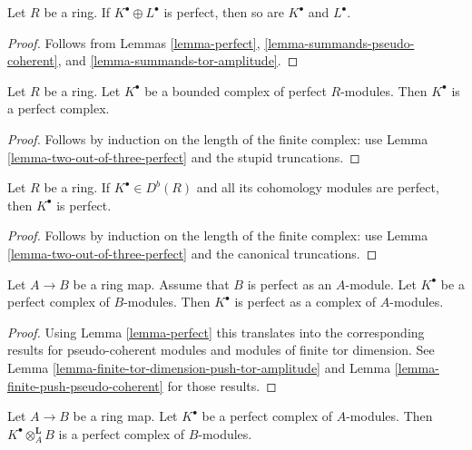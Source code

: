 \begin{lemma}
\label{lemma-summands-perfect}
Let $R$ be a ring. If $K^\bullet \oplus L^\bullet$ is perfect, then
so are $K^\bullet$ and $L^\bullet$.
\end{lemma}

\begin{proof}
Follows from
Lemmas \ref{lemma-perfect}, \ref{lemma-summands-pseudo-coherent}, and
\ref{lemma-summands-tor-amplitude}.
\end{proof}

\begin{lemma}
\label{lemma-complex-perfect-modules}
Let $R$ be a ring. Let $K^\bullet$ be a bounded complex of perfect
$R$-modules. Then $K^\bullet$ is a perfect complex.
\end{lemma}

\begin{proof}
Follows by induction on the length of the finite complex: use
Lemma \ref{lemma-two-out-of-three-perfect}
and the stupid truncations.
\end{proof}

\begin{lemma}
\label{lemma-cohomology-perfect}
Let $R$ be a ring. If $K^\bullet \in D^b(R)$ and all its cohomology
modules are perfect, then $K^\bullet$ is perfect.
\end{lemma}

\begin{proof}
Follows by induction on the length of the finite complex: use
Lemma \ref{lemma-two-out-of-three-perfect}
and the canonical truncations.
\end{proof}

\begin{lemma}
\label{lemma-perfect-push-perfect}
Let $A \to B$ be a ring map. Assume that $B$ is perfect as
an $A$-module. Let $K^\bullet$ be a perfect complex of $B$-modules.
Then $K^\bullet$ is perfect as a complex of $A$-modules.
\end{lemma}

\begin{proof}
Using
Lemma \ref{lemma-perfect}
this translates into the corresponding results for pseudo-coherent modules
and modules of finite tor dimension. See
Lemma \ref{lemma-finite-tor-dimension-push-tor-amplitude}
and
Lemma \ref{lemma-finite-push-pseudo-coherent}
for those results.
\end{proof}

\begin{lemma}
\label{lemma-pull-perfect}
Let $A \to B$ be a ring map.
Let $K^\bullet$ be a perfect
complex of $A$-modules. Then $K^\bullet \otimes_A^{\mathbf{L}} B$
is a perfect complex of $B$-modules.
\end{lemma}

